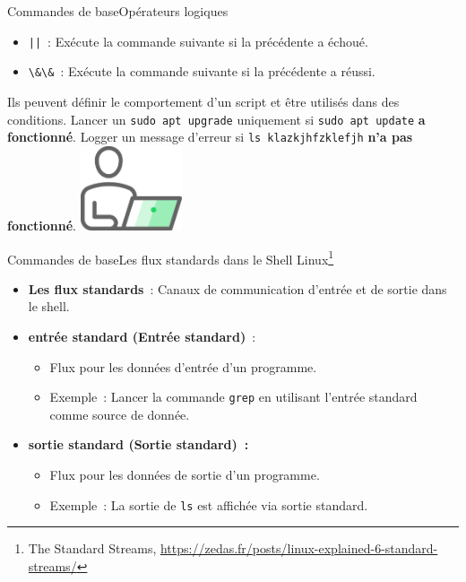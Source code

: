 \documentclass{beamer}
\begin{document}
    \begin{frame}{Commandes de base}{Opérateurs logiques}
        \begin{itemize}
            \item \lstinline{||}~: Exécute la commande suivante si la précédente a échoué.
            \item \lstinline{\&\&}~: Exécute la commande suivante si la précédente a réussi.
        \end{itemize}
        Ils peuvent définir le comportement d'un script et être utilisés dans des conditions.
        \bigbreak
        Lancer un \lstinline{sudo apt upgrade} uniquement si \lstinline{sudo apt update} \textbf{a fonctionné}.
        \bigbreak
        Logger un message d'erreur si \lstinline{ls klazkjhfzklefjh} \textbf{n'a pas fonctionné}.
        \bigbreak
        \centering
        \includegraphics[width=3cm]{image/guy-in-front-of-desktop}
    \end{frame}

    \begin{frame}{Commandes de base}{Les flux standards dans le Shell Linux\footnote{\label{standard-stream}The Standard Streams, \url{https://zedas.fr/posts/linux-explained-6-standard-streams/}}}
        \begin{itemize}
            \item \textbf{Les flux standards}~: Canaux de communication d'entrée et de sortie dans le shell.
            \item \textbf{entrée standard (Entrée standard)}~:
            \begin{itemize}
                \item Flux pour les données d'entrée d'un programme.
                \item Exemple~: Lancer la commande \lstinline{grep} en utilisant l'entrée standard comme source de donnée.
            \end{itemize}
            \item \textbf{sortie standard (Sortie standard)~:}
            \begin{itemize}
                \item Flux pour les données de sortie d'un programme.
                \item Exemple~: La sortie de \lstinline{ls} est affichée via sortie standard.
            \end{itemize}
        \end{itemize}
    \end{frame}
\end{document}
